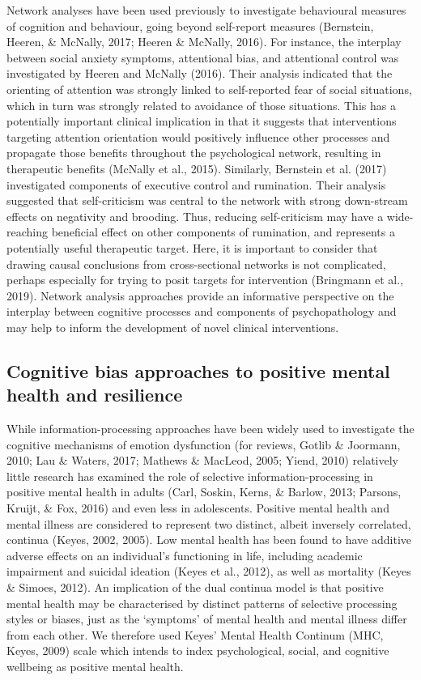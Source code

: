 \documentclass[
  english,
  man]{apa6}
\begin{document}
Network analyses have been used previously to investigate behavioural measures of cognition and behaviour, going beyond self-report measures (Bernstein, Heeren, \& McNally, 2017; Heeren \& McNally, 2016). For instance, the interplay between social anxiety symptoms, attentional bias, and attentional control was investigated by Heeren and McNally (2016). Their analysis indicated that the orienting of attention was strongly linked to self-reported fear of social situations, which in turn was strongly related to avoidance of those situations. This has a potentially important clinical implication in that it suggests that interventions targeting attention orientation would positively influence other processes and propagate those benefits throughout the psychological network, resulting in therapeutic benefits (McNally et al., 2015). Similarly, Bernstein et al. (2017) investigated components of executive control and rumination. Their analysis suggested that self-criticism was central to the network with strong down-stream effects on negativity and brooding. Thus, reducing self-criticism may have a wide-reaching beneficial effect on other components of rumination, and represents a potentially useful therapeutic target. Here, it is important to consider that drawing causal conclusions from cross-sectional networks is not complicated, perhaps especially for trying to posit targets for intervention (Bringmann et al., 2019). Network analysis approaches provide an informative perspective on the interplay between cognitive processes and components of psychopathology and may help to inform the development of novel clinical interventions.

\hypertarget{cognitive-bias-approaches-to-positive-mental-health-and-resilience}{%
\subsection{Cognitive bias approaches to positive mental health and resilience}\label{cognitive-bias-approaches-to-positive-mental-health-and-resilience}}

While information-processing approaches have been widely used to investigate the cognitive mechanisms of emotion dysfunction (for reviews, Gotlib \& Joormann, 2010; Lau \& Waters, 2017; Mathews \& MacLeod, 2005; Yiend, 2010) relatively little research has examined the role of selective information-processing in positive mental health in adults (Carl, Soskin, Kerns, \& Barlow, 2013; Parsons, Kruijt, \& Fox, 2016) and even less in adolescents. Positive mental health and mental illness are considered to represent two distinct, albeit inversely correlated, continua (Keyes, 2002, 2005). Low mental health has been found to have additive adverse effects on an individual's functioning in life, including academic impairment and suicidal ideation (Keyes et al., 2012), as well as mortality (Keyes \& Simoes, 2012). An implication of the dual continua model is that positive mental health may be characterised by distinct patterns of selective processing styles or biases, just as the `symptoms' of mental health and mental illness differ from each other. We therefore used Keyes' Mental Health Continum (MHC, Keyes, 2009) scale which intends to index psychological, social, and cognitive wellbeing as positive mental health.
\end{document}
